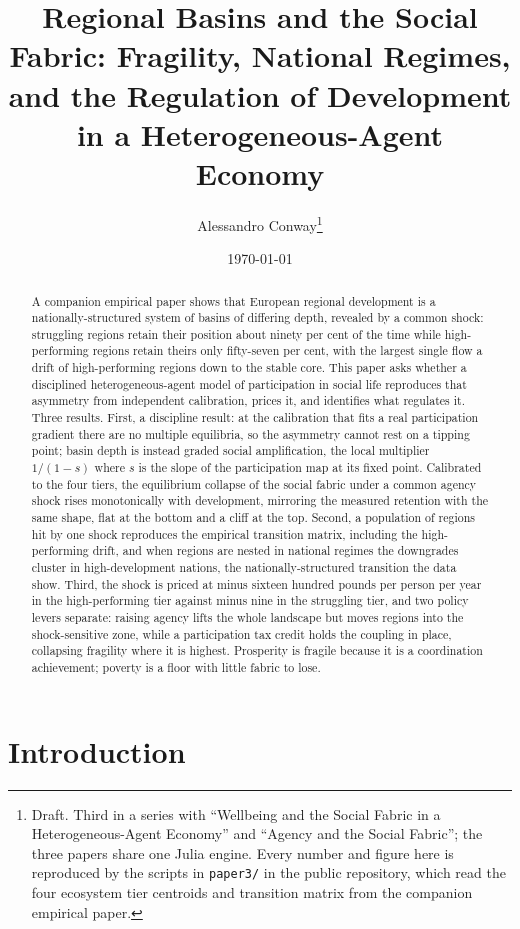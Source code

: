 \documentclass[11pt]{article}
\title{Regional Basins and the Social Fabric: Fragility, National
Regimes, and the Regulation of Development in a Heterogeneous-Agent
Economy}
\author{Alessandro Conway\thanks{Draft. Third in a series with
``Wellbeing and the Social Fabric in a Heterogeneous-Agent Economy'' and
``Agency and the Social Fabric''; the three papers share one Julia
engine. Every number and figure here is reproduced by the scripts in
\texttt{paper3/} in the public repository, which read the four ecosystem
tier centroids and transition matrix from the companion empirical paper.}}
\date{\today}
\begin{document}
\maketitle

\begin{abstract}
A companion empirical paper shows that European regional development is a
nationally-structured system of basins of differing depth, revealed by a
common shock: struggling regions retain their position about ninety per
cent of the time while high-performing regions retain theirs only
fifty-seven per cent, with the largest single flow a drift of
high-performing regions down to the stable core. This paper asks whether a
disciplined heterogeneous-agent model of participation in social life
reproduces that asymmetry from independent calibration, prices it, and
identifies what regulates it. Three results. First, a discipline result:
at the calibration that fits a real participation gradient there are no
multiple equilibria, so the asymmetry cannot rest on a tipping point;
basin depth is instead graded social amplification, the local multiplier
$1/(1-s)$ where $s$ is the slope of the participation map at its fixed
point. Calibrated to the four tiers, the equilibrium collapse of the
social fabric under a common agency shock rises monotonically with
development, mirroring the measured retention with the same shape, flat at
the bottom and a cliff at the top. Second, a population of regions hit by
one shock reproduces the empirical transition matrix, including the
high-performing drift, and when regions are nested in national regimes the
downgrades cluster in high-development nations, the nationally-structured
transition the data show. Third, the shock is priced at minus sixteen
hundred pounds per person per year in the high-performing tier against
minus nine in the struggling tier, and two policy levers separate: raising
agency lifts the whole landscape but moves regions into the
shock-sensitive zone, while a participation tax credit holds the coupling
in place, collapsing fragility where it is highest. Prosperity is fragile
because it is a coordination achievement; poverty is a floor with little
fabric to lose.
\end{abstract}

\section{Introduction}
\end{document}
